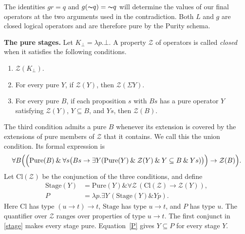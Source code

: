 \documentclass[12pt,leqno]{article}
\newcommand{\AND}{\ensuremath{\mathbin{\&}}}
\newcommand{\IC}{\ensuremath{\rightarrow}}
\newcommand{\NOT}{\ensuremath{\text{$\thicksim$}}}
\newcommand{\Pure}{\mathrm{Pure}}
\newcommand{\Stage}{\mathrm{Stage}}
\newcommand{\Clos}{\mathrm{Cl}}
\newcommand{\cZ}{\mathcal Z}
\newcommand{\Kbot}{K_{\bot}}
\begin{document}
The identities $gr=q$ and $g(\NOT q)=\NOT q$ will determine the
values of our final operators at the two arguments used in the
contradiction. Both $L$ and $g$ are closed logical operators and
are therefore pure by the Purity schema.

\medskip
\noindent\textbf{The pure stages.}
Let $\Kbot=\lambda p.\bot$. A property $\cZ$ of operators is called
\emph{closed} when it satisfies the following conditions.
\begin{enumerate}
\item $\cZ(\Kbot)$.
\item For every pure $Y$, if $\cZ(Y)$, then $\cZ(\Sigma Y)$.
\item For every pure $B$, if each proposition $s$ with $Bs$ has a
pure operator $Y$ satisfying $\cZ(Y)$, $Y\subseteq B$, and $Ys$,
then $\cZ(B)$.
\end{enumerate}
The third condition admits a pure $B$ whenever its extension is covered
by the extensions of pure members of $\cZ$ that it contains. We call
this the union condition. Its formal expression is
\[
 \forall B\Bigl(\Bigl(\Pure(B)\AND\forall s
  \bigl(Bs\IC\exists Y(\Pure(Y)\AND\cZ(Y)\AND Y\subseteq B\AND Ys)\bigr)
  \Bigr)\IC\cZ(B)\Bigr).
\]
Let $\Clos(\cZ)$ be the conjunction of the three conditions, and define
\begin{align}
 \Stage(Y)&=\Pure(Y)\AND\forall\cZ\,(\Clos(\cZ)\IC\cZ(Y)),
 \label{stage}\\
 P&=\lambda p.\exists Y\,(\Stage(Y)\AND Yp).
 \label{P}
\end{align}
Here $\Clos$ has type $(u\to t)\to t$, $\Stage$ has type $u\to t$,
and $P$ has type $u$. The quantifier over $\cZ$ ranges over properties
of type $u\to t$. The first conjunct in \eqref{stage} makes every
stage pure. Equation~\eqref{P} gives $Y\subseteq P$ for every stage $Y$.
\end{document}
